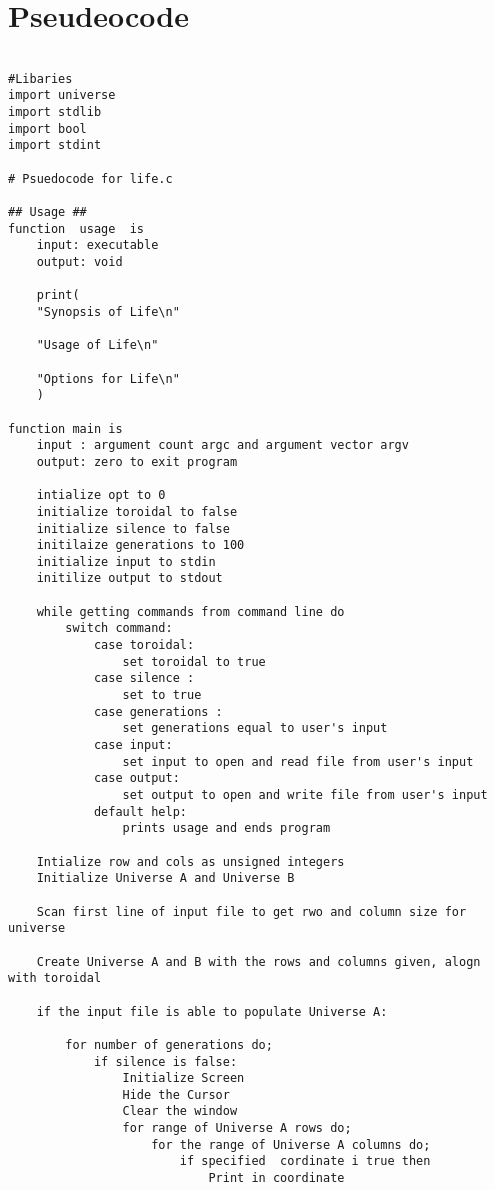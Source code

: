 \documentclass[11pt]{article} %
\begin{document}
\section*{Pseudeocode}
\begin{flushleft}
\begin{lstlisting}

#Libaries
import universe
import stdlib
import bool
import stdint

# Psuedocode for life.c

## Usage ##
function  usage  is
    input: executable
    output: void

    print(
    "Synopsis of Life\n"

    "Usage of Life\n"

    "Options for Life\n"
    )

function main is
    input : argument count argc and argument vector argv
    output: zero to exit program
    
    intialize opt to 0
    initialize toroidal to false
    initialize silence to false
    initilaize generations to 100
    initialize input to stdin
    initilize output to stdout
    
    while getting commands from command line do
        switch command:
            case toroidal:
                set toroidal to true
            case silence :
                set to true
            case generations :
                set generations equal to user's input
            case input:
                set input to open and read file from user's input
            case output:
                set output to open and write file from user's input
            default help:
                prints usage and ends program

    Intialize row and cols as unsigned integers
    Initialize Universe A and Universe B

    Scan first line of input file to get rwo and column size for universe

    Create Universe A and B with the rows and columns given, alogn with toroidal

    if the input file is able to populate Universe A:
        
        for number of generations do;
            if silence is false:
                Initialize Screen
                Hide the Cursor
                Clear the window
                for range of Universe A rows do;
                    for the range of Universe A columns do;
                        if specified  cordinate i true then
                            Print in coordinate


\end{lstlisting}
\end{flushleft}
\end{document}
